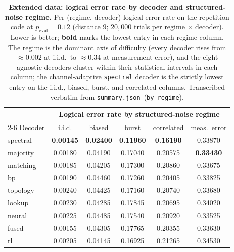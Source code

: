 \documentclass[reprint,aps,prxquantum,amsmath,amssymb,floatfix,nofootinbib,longbibliography]{revtex4-2}
\theoremstyle{definition}
\theoremstyle{remark}
\theoremstyle{plain}
\begin{document}
\begin{table}[tb]
    \centering
    \caption{\textbf{Extended data: logical error rate by decoder and structured-noise regime.} Per-(regime, decoder) logical error rate on the repetition code at $p_{\mathrm{eval}}=0.12$ (distance $9$; $20{,}000$ trials per regime$\,\times\,$decoder). Lower is better; \textbf{bold} marks the lowest entry in each regime column. The regime is the dominant axis of difficulty (every decoder rises from $\approx0.002$ at i.i.d.\ to $\approx0.34$ at measurement error), and the eight agnostic decoders cluster within their statistical intervals in each column; the channel-adaptive \texttt{spectral} decoder is the strictly lowest entry on the i.i.d., biased, burst, and correlated columns. Transcribed verbatim from \texttt{summary.json}~(\texttt{by\_regime}).}
    \label{tab:ed_ler}
\begin{tabular}{lccccc}
\toprule
 & \multicolumn{5}{c}{Logical error rate by structured-noise regime} \\
\cmidrule(lr){2-6}
Decoder & i.i.d. & biased & burst & correlated & meas.\ error \\
\midrule
spectral  & \textbf{0.00145} & \textbf{0.02400} & \textbf{0.11960} & \textbf{0.16190} & 0.33870 \\
majority  & 0.00180 & 0.04190 & 0.17040 & 0.20575 & \textbf{0.33430} \\
matching  & 0.00185 & 0.04205 & 0.17300 & 0.20860 & 0.33675 \\
bp        & 0.00190 & 0.04460 & 0.17260 & 0.20405 & 0.33825 \\
topology  & 0.00240 & 0.04425 & 0.17160 & 0.20740 & 0.33680 \\
lookup    & 0.00230 & 0.04285 & 0.17845 & 0.20695 & 0.34020 \\
neural    & 0.00225 & 0.04485 & 0.17540 & 0.20920 & 0.33525 \\
fused     & 0.00155 & 0.04305 & 0.17765 & 0.20355 & 0.33630 \\
rl        & 0.00205 & 0.04145 & 0.16925 & 0.21265 & 0.34530 \\
\bottomrule
\end{tabular}
\end{table}
\end{document}
